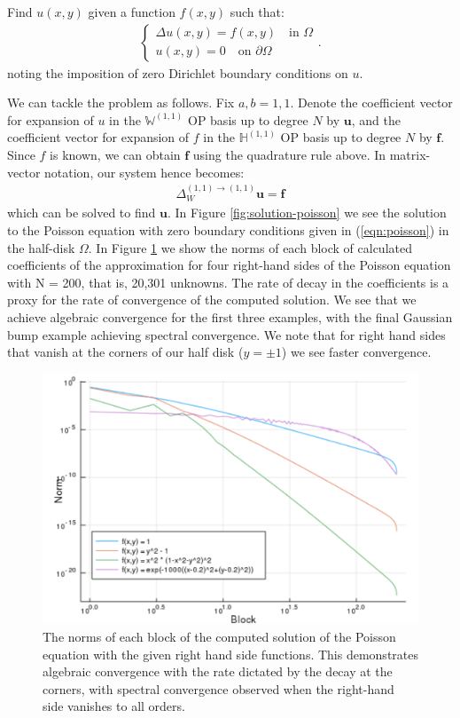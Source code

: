 \documentclass[11pt, oneside]{article}   	%
\newcommand{\bstodoinline}{\todo[color=pink,inline=true]}
\newcommand{\hdop}{H}
\newcommand{\bighdopii}{{\mathbb{\hdop}^{(1,1)}}}
\newcommand{\laplacewii}{\Delta_W^{(1,1)\to(1,1)}}
\newcommand{\bigWii}{{\mathbb{W}^{(1,1)}}}
\begin{document}
Find \(u(x,y)\) given a function \(f(x,y)\) such that:
\begin{align}
	\begin{cases}
    		\Delta u(x,y) = f(x,y) \quad \text{in } \Omega \\
		u(x,y) = 0 \quad \text{on } \partial \Omega
	\end{cases}.
	\label{eqn:poisson}
\end{align}
noting the imposition of zero Dirichlet boundary conditions on $u$.

We can tackle the problem as follows. Fix \(a, b = 1,1\). Denote the coefficient vector for expansion of $u$ in the $\bigWii$ OP basis up to degree $N$ by $\mathbf{u}$, and the coefficient vector for expansion of $f$ in the $\bighdopii$ OP basis up to degree $N$ by $\mathbf{f}$. Since $f$ is known, we can obtain $\mathbf{f}$ using the quadrature rule above. In matrix-vector notation, our system hence becomes:
\begin{align*}
    \laplacewii \mathbf{u} = \mathbf{f}
\end{align*}
which can be solved to find $\mathbf{u}$.
In Figure \ref{fig:solution-poisson} we see the solution to the Poisson equation with zero boundary conditions given in (\ref{eqn:poisson}) in the half-disk $\Omega$. In Figure \ref{fig:solutionblocknorms} we show the norms of each block of calculated coefficients of the approximation for four right-hand sides of the Poisson equation with N = 200, that is, 20,301 unknowns. The rate of decay in the coefficients is a proxy for the rate of convergence of the computed solution. We see that we achieve algebraic convergence for the first three examples, with the final Gaussian bump example achieving spectral convergence. We note that for right hand sides that vanish at the corners of our half disk ($y = \pm 1$) we see faster convergence. \bstodoinline{Improve above}

\begin{figure}
        	\includegraphics[scale=0.5]{solutionblocknorms}
	\centering
	\caption{The norms of each block of the computed solution of the Poisson equation with the given right hand side functions. This demonstrates algebraic convergence with the rate dictated by the decay at the corners, with spectral convergence observed when the right-hand side vanishes to all orders.  \bstodoinline{N=200 blocks here}}
        	\label{fig:solutionblocknorms}
\end{figure}
\end{document}
